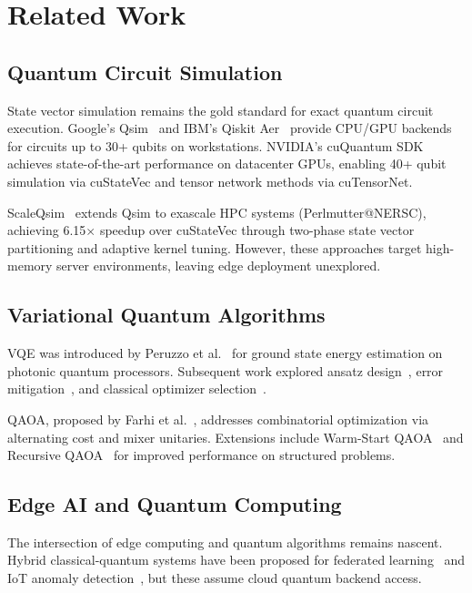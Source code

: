 \section{Related Work}
\label{sec:related}

\subsection{Quantum Circuit Simulation}

State vector simulation remains the gold standard for exact quantum circuit execution. Google's Qsim~\cite{qsim} and IBM's Qiskit Aer~\cite{qiskit} provide CPU/GPU backends for circuits up to 30+ qubits on workstations. NVIDIA's cuQuantum SDK~\cite{cuquantum} achieves state-of-the-art performance on datacenter GPUs, enabling 40+ qubit simulation via cuStateVec and tensor network methods via cuTensorNet.

ScaleQsim~\cite{scaleqsim} extends Qsim to exascale HPC systems (Perlmutter@NERSC), achieving 6.15$\times$ speedup over cuStateVec through two-phase state vector partitioning and adaptive kernel tuning. However, these approaches target high-memory server environments, leaving edge deployment unexplored.

\subsection{Variational Quantum Algorithms}

VQE was introduced by Peruzzo et al.~\cite{peruzzo2014variational} for ground state energy estimation on photonic quantum processors. Subsequent work explored ansatz design~\cite{kandala2017hardware}, error mitigation~\cite{temme2017error}, and classical optimizer selection~\cite{lavrijsen2020classical}.

QAOA, proposed by Farhi et al.~\cite{farhi2014quantum}, addresses combinatorial optimization via alternating cost and mixer unitaries. Extensions include Warm-Start QAOA~\cite{egger2021warm} and Recursive QAOA~\cite{bravyi2020obstacles} for improved performance on structured problems.

\subsection{Edge AI and Quantum Computing}

The intersection of edge computing and quantum algorithms remains nascent. Hybrid classical-quantum systems have been proposed for federated learning~\cite{chen2021federated} and IoT anomaly detection~\cite{liu2022quantum}, but these assume cloud quantum backend access.

